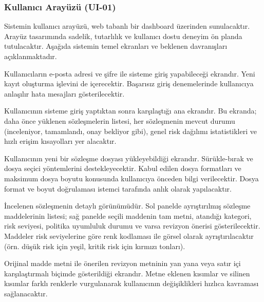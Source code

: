 \documentclass[12pt, a4paper]{article}
\begin{document}
\subsubsection{Kullanıcı Arayüzü (UI-01)}

Sistemin kullanıcı arayüzü, web tabanlı bir dashboard üzerinden sunulacaktır. Arayüz tasarımında sadelik, tutarlılık ve kullanıcı dostu deneyim ön planda tutulacaktır. Aşağıda sistemin temel ekranları ve beklenen davranışları açıklanmaktadır.

\begin{description}[leftmargin=2cm, style=nextline]
    \item[Giriş ve Kimlik Doğrulama Ekranı]
    Kullanıcıların e-posta adresi ve şifre ile sisteme giriş yapabileceği ekrandır. Yeni kayıt oluşturma işlevini de içerecektir. Başarısız giriş denemelerinde kullanıcıya anlaşılır hata mesajları gösterilecektir.

    \item[Ana Kontrol Paneli (Dashboard)]
    Kullanıcının sisteme giriş yaptıktan sonra karşılaştığı ana ekrandır. Bu ekranda; daha önce yüklenen sözleşmelerin listesi, her sözleşmenin mevcut durumu (inceleniyor, tamamlandı, onay bekliyor gibi), genel risk dağılımı istatistikleri ve hızlı erişim kısayolları yer alacaktır.

    \item[Sözleşme Yükleme Ekranı]
    Kullanıcının yeni bir sözleşme dosyası yükleyebildiği ekrandır. Sürükle-bırak ve dosya seçici yöntemlerini destekleyecektir. Kabul edilen dosya formatları ve maksimum dosya boyutu konusunda kullanıcıya önceden bilgi verilecektir. Dosya format ve boyut doğrulaması istemci tarafında anlık olarak yapılacaktır.

    \item[Sözleşme İnceleme ve Analiz Ekranı]
    İncelenen sözleşmenin detaylı görünümüdür. Sol panelde ayrıştırılmış sözleşme maddelerinin listesi; sağ panelde seçili maddenin tam metni, atandığı kategori, risk seviyesi, politika uyumluluk durumu ve varsa revizyon önerisi gösterilecektir. Maddeler risk seviyelerine göre renk kodlaması ile görsel olarak ayrıştırılacaktır (örn. düşük risk için yeşil, kritik risk için kırmızı tonları).

    \item[Karşılaştırmalı Görünüm (Redline) Ekranı]
    Orijinal madde metni ile önerilen revizyon metninin yan yana veya satır içi karşılaştırmalı biçimde gösterildiği ekrandır. Metne eklenen kısımlar ve silinen kısımlar farklı renklerle vurgulanarak kullanıcının değişiklikleri hızlıca kavraması sağlanacaktır.


\end{description}
\end{document}
